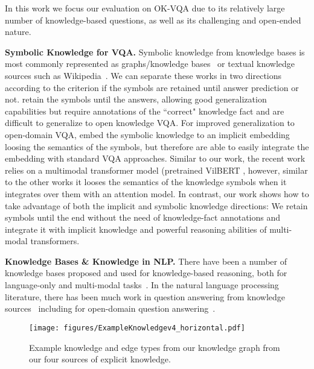 \documentclass[final]{cvpr}
\providecommand{\myparagraph}[1]{\noindent\textbf{#1.}}
\begin{document}
In this work we focus our evaluation on OK-VQA due to its relatively large number of knowledge-based questions, as well as its challenging and open-ended nature.

 
\myparagraph{Symbolic Knowledge for VQA}
Symbolic knowledge from knowledge bases is most commonly represented as graphs/knowledge bases~\cite{guohao20mm,narasimhan2018out, narasimhan18, wang17a, wang17b} or textual knowledge sources such as Wikipedia~\cite{marino19cvpr,wu16}. We can separate these works in two directions according to the criterion if the symbols are retained until answer prediction or not. \cite{narasimhan2018out,wang17a,wang17b} retain the symbols until the answers, allowing good generalization capabilities but require annotations of the ``correct" knowledge fact and are difficult to generalize to open knowledge VQA.
For improved generalization to open-domain VQA, \cite{garderes2020conceptbert,marino19cvpr,guohao20mm,wu16} embed the symbolic knowledge to an implicit embedding loosing the semantics of the symbols, but therefore are able to easily integrate the embedding with standard VQA approaches.  Similar to our work, the recent work \cite{garderes2020conceptbert} relies on a multimodal transformer model (pretrained VilBERT \cite{lu19vilbert}, 
however, similar to the other works it looses the semantics of the knowledge symbols when it integrates over them with an attention model.
In contrast, our work shows how to take advantage of both the implicit and symbolic knowledge directions: We retain symbols until the end without the need of knowledge-fact annotations and integrate it with implicit knowledge and powerful reasoning abilities of multi-modal transformers. 


\myparagraph{Knowledge Bases \& Knowledge in NLP}
There have been a number of knowledge bases proposed and used for knowledge-based reasoning, both for language-only and multi-modal tasks~\cite{zhueccv14,neil,levan,sadeghi15,zhu15,ZhuLF17,bhakthavatsalam2020dogs, Miller95,krishnavisualgenome}. In the natural language processing literature, there has been much work in question answering from knowledge sources~\cite{berant13, yao14, bordes14} including for open-domain question answering~\cite{chen2017reading, wang2017r, yang2015wikiqa, yang2019end}.

\begin{figure*}[t]
\centering
\texttt{[image: figures/ExampleKnowledgev4\_horizontal.pdf]}
\caption{Example knowledge and edge types from our knowledge graph from our four sources of explicit knowledge.}
\vspace{-.3cm}
\label{fig:knowledge}
\end{figure*} 
\end{document}
